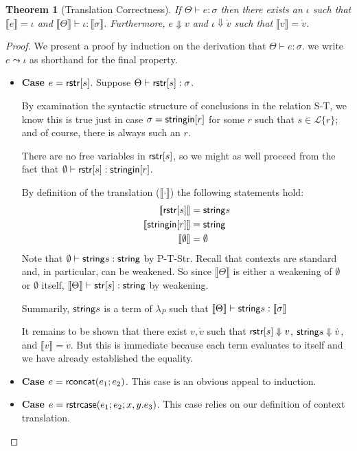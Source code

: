 \documentclass[11pt,leqno]{article}
\newtheorem{thm}{Theorem}
\theoremstyle{definition}
\newcommand{\Lagr}{\mathcal{L}}
\newcommand{\lang}[1]{\Lagr\{#1\}}
\newcommand{\lambdap}{\lambda_P}
\newcommand{\stringin}[1]{{\sf stringin}[#1]}
\renewcommand{\tstr}[1]{{{\sf str}[#1]}}
\newcommand{\str}{{\sf string}}
\newcommand{\tctx}{\Theta} %
\newcommand{\strcase}[3]{ {\sf rstrcase}(#1; #2; #3)}
\newcommand{\trden}[1]{\llbracket #1 \rrbracket} %
\newcommand{\treduces}{ \Downarrow }
\newcommand{\sreduces}{ \Downarrow }
\begin{document}
\begin{thm}[Translation Correctness]\label{thm:trcorrect}
  If $\tctx \vdash e : \sigma$ then 
  there exists an $\iota$ such that $\trden{e} = \iota$
  and $\trden{\tctx} \vdash \iota : \trden{\sigma}$.
  Furthermore, $e \sreduces v$ and
  $\iota \treduces \dot{v}$ such that
  $\trden{v} = \dot{v}$.
\end{thm}
\begin{proof}
We present a proof by induction on the derivation that $\tctx \vdash e : \sigma$.
we write $e \leadsto \iota$ as shorthand for the final property.

\begin{itemize}[label=$ $, itemsep=1ex]
\item \textbf{Case $e = {\sf rstr}[s]$}. Suppose $\tctx \vdash \rstr{s} : \sigma$.

By examination the syntactic structure of conclusions in the relation S-T, 
we know this is true just in case $\sigma = \stringin{r}$ for some $r$ such that
$s \in \lang{r}$; and of course, there is always such an $r$.

There are no free variables in ${\sf rstr}[s]$, so we might as well proceed from the
fact that $\emptyset \vdash \rstr{s} : \stringin{r}$.

By definition of the translation ($\trden{\cdot}$) the following statements hold:
\begin{align}
\trden{\rstr{s}} &= \str{s} \\
\trden{\stringin{r}} &= \str \\
\trden{\emptyset} &= \emptyset
\end{align}
Note that $\emptyset \vdash \str{s} : \str$ by P-T-Str.
Recall that contexts are standard and, in particular, can be weakened.
So since $\trden{\tctx}$ is either a weakening of $\emptyset$ or $\emptyset$ itself,
$\trden{\tctx} \vdash \tstr{s} : \str$ by weakening.

Summarily, $\str{s}$ is a term of $\lambdap$ such that $\trden{\tctx} \vdash \str{s} : \trden{\sigma}$

It remains to be shown that there exist $v, \dot{v}$ such that $\rstr{s} \sreduces v$,
$\str{s} \treduces \dot{v}$, and $\trden{v} = \dot{v}$. But this is immediate because
each term evaluates to itself and we have already established the equality.

\item \textbf{Case $e = {\sf rconcat}(e_1;e_2)$}. This case is an obvious appeal to induction.

\item \textbf{Case $e = \strcase{e_1}{e_2}{x,y.e_3}$}. This case relies on our definition
of context translation.


\end{itemize}
\end{proof}
\end{document}
